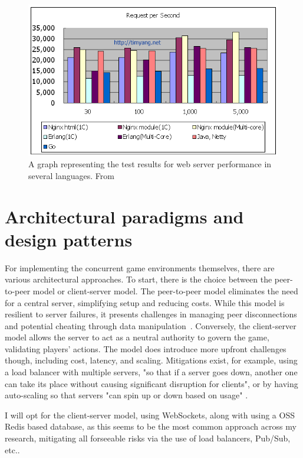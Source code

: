 \documentclass[]{project_interim}
\begin{document}
\begin{figure}[ht!]
  \centering
  \includegraphics[width=\linewidth]{c_erlang_java_go}
  \vspace*{-0.5cm}
  \caption{A graph representing the test results for web server performance in several languages. From \cite{yang_c_nodate}}
  \label{fig: 1}
\end{figure}

\section{Architectural paradigms and design patterns}

For implementing the concurrent game environments themselves, there are various architectural approaches.
To start, there is the choice between the peer-to-peer model or client-server model.
The peer-to-peer model eliminates the need for a central server, simplifying setup and
reducing costs. While this model is resilient to server failures, it presents challenges
in managing peer disconnections and potential cheating through data manipulation~\cite{franchetti_coping_2020}.
Conversely, the client-server model allows the server to act as a neutral authority to govern the game,
validating players' actions. The model does introduce more upfront challenges though, including cost,
latency, and scaling. Mitigations exist, for example, using a load balancer with multiple servers,
"so that if a server goes down, another one can take its place without causing significant
disruption for clients", or by having auto-scaling so that servers "can spin up or down
based on usage" \cite{pandey_peer--peer_2022}.

I will opt for the client-server model, using WebSockets, along with using a OSS Redis based database,
as this seems to be the most common approach
across my research, mitigating all forseeable risks via the use of load balancers,
Pub/Sub, etc..
\end{document}
